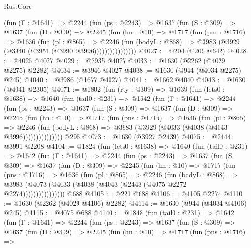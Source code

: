 \begin{lexlean}{RustCore}
\begin{coremodule}
            (fun (Γ : @1641) =>
            @2244
              (fun (ps : @2243) =>
              @1637
                (fun (S : @309) =>
                @1637
                  (fun (D : @309) =>
                  @2245
                    (fun (hn : @10) =>
                    @1717
                      (fun (pns : @1716) =>
                      @1636
                        (fun (pl : @865) =>
                        @2246
                          (fun (bodyL : @868) =>
                          @3983 (@3929 (@3940 (@3951 (@3990 @3996))))))))))))))))
@4027 := @204 (@209 @642)
@4028 := @4025 @4027
@4029 := @3935 @4027
@4033 := @1630 (@2262 (@4029 @2275) @2282)
@4034 := @3946 @4027
@4038 := @1630 (@944 (@4034 @2275) @245)
@4040 := @3986 (@1677 @4027)
@4041 := @1662 @4040
@4043 := @1630 (@4041 @2305)
@4071 := @1802
    (fun (rty : @309) =>
    @1639
      (fun (lets0 : @1638) =>
      @1640
        (fun (tail0 : @231) =>
        @1642
          (fun (Γ : @1641) =>
          @2244
            (fun (ps : @2243) =>
            @1637
              (fun (S : @309) =>
              @1637
                (fun (D : @309) =>
                @2245
                  (fun (hn : @10) =>
                  @1717
                    (fun (pns : @1716) =>
                    @1636
                      (fun (pl : @865) =>
                      @2246
                        (fun (bodyL : @868) =>
                        @3983 (@3929 (@4033 (@4038 (@4043 @3996)))))))))))))))
    @295
@4073 := @1630 (@3927 @2439)
@4075 := @2444 @3991 @2208
@4104 := @1824
    (fun (lets0 : @1638) =>
    @1640
      (fun (tail0 : @231) =>
      @1642
        (fun (Γ : @1641) =>
        @2244
          (fun (ps : @2243) =>
          @1637
            (fun (S : @309) =>
            @1637
              (fun (D : @309) =>
              @2245
                (fun (hn : @10) =>
                @1717
                  (fun (pns : @1716) =>
                  @1636
                    (fun (pl : @865) =>
                    @2246
                      (fun (bodyL : @868) =>
                      @3983 (@4073 (@4033 (@4038 (@4043 (@2443 (@4075 @2272 @2274))))))))))))))))
    @688
@4105 := @221 @688
@4106 := @4105 @2274
@4110 := @1630 (@2262 (@4029 @4106) @2282)
@4114 := @1630 (@944 (@4034 @4106) @245)
@4115 := @4075 @688
@4140 := @1848
    (fun (tail0 : @231) =>
    @1642
      (fun (Γ : @1641) =>
      @2244
        (fun (ps : @2243) =>
        @1637
          (fun (S : @309) =>
          @1637
            (fun (D : @309) =>
            @2245
              (fun (hn : @10) =>
              @1717
                (fun (pns : @1716) =>

\end{coremodule}
\end{lexlean}
